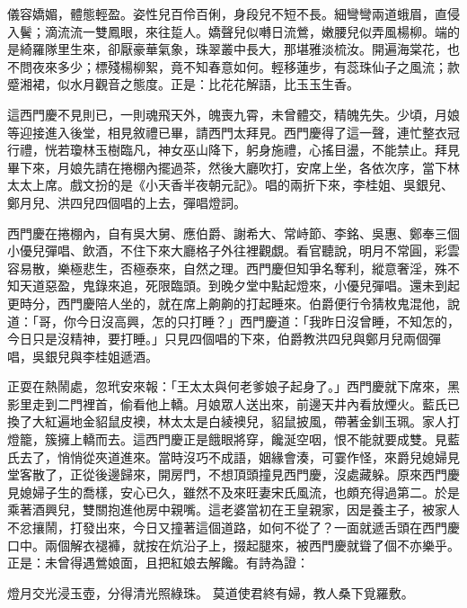 儀容嬌媚，體態輕盈。姿性兒百伶百俐，身段兒不短不長。細彎彎兩道蛾眉，直侵入鬢；滴流流一雙鳳眼，來往踅人。嬌聲兒似囀日流鶯，嫩腰兒似弄風楊柳。端的是綺羅隊里生來，卻厭豪華氣象，珠翠叢中長大，那堪雅淡梳汝。開遍海棠花，也不問夜來多少；標殘楊柳絮，竟不知春意如何。輕移蓮步，有蕊珠仙子之風流；款蹙湘裙，似水月觀音之態度。正是：比花花解語，比玉玉生香。

這西門慶不見則已，一則魂飛天外，魄喪九霄，未曾體交，精魄先失。少頃，月娘等迎接進入後堂，相見敘禮已畢，請西門太拜見。西門慶得了這一聲，連忙整衣冠行禮，恍若瓊林玉樹臨凡，神女巫山降下，躬身施禮，心搖目盪，不能禁止。拜見畢下來，月娘先請在捲棚內擺過茶，然後大廳吹打，安席上坐，各依次序，當下林太太上席。戲文扮的是《小天香半夜朝元記》。唱的兩折下來，李桂姐、吳銀兒、鄭月兒、洪四兒四個唱的上去，彈唱燈詞。

西門慶在捲棚內，自有吳大舅、應伯爵、謝希大、常峙節、李銘、吳惠、鄭奉三個小優兒彈唱、飲酒，不住下來大廳格子外往裡觀覷。看官聽說，明月不常圓，彩雲容易散，樂極悲生，否極泰來，自然之理。西門慶但知爭名奪利，縱意奢淫，殊不知天道惡盈，鬼錄來追，死限臨頭。到晚夕堂中點起燈來，小優兒彈唱。還未到起更時分，西門慶陪人坐的，就在席上齁齁的打起睡來。伯爵便行令猜枚鬼混他，說道：「哥，你今日沒高興，怎的只打睡？」西門慶道：「我昨日沒曾睡，不知怎的，今日只是沒精神，要打睡。」只見四個唱的下來，伯爵教洪四兒與鄭月兒兩個彈唱，吳銀兒與李桂姐遞酒。

正耍在熱鬧處，忽玳安來報：「王太太與何老爹娘子起身了。」西門慶就下席來，黑影里走到二門裡首，偷看他上轎。月娘眾人送出來，前邊天井內看放煙火。藍氏已換了大紅遍地金貂鼠皮襖，林太太是白綾襖兒，貂鼠披風，帶著金釧玉珮。家人打燈籠，簇擁上轎而去。這西門慶正是餓眼將穿，饞涎空咽，恨不能就要成雙。見藍氏去了，悄悄從夾道進來。當時沒巧不成語，姻緣會湊，可霎作怪，來爵兒媳婦見堂客散了，正從後邊歸來，開房門，不想頂頭撞見西門慶，沒處藏躲。原來西門慶見媳婦子生的喬樣，安心已久，雖然不及來旺妻宋氏風流，也頗充得過第二。於是乘著酒興兒，雙關抱進他房中親嘴。這老婆當初在王皇親家，因是養主子，被家人不忿攘鬧，打發出來，今日又撞著這個道路，如何不從了？一面就遞舌頭在西門慶口中。兩個解衣褪褲，就按在炕沿子上，掇起腿來，被西門慶就聳了個不亦樂乎。正是：未曾得遇鶯娘面，且把紅娘去解饞。有詩為證：

燈月交光浸玉壺，分得清光照綠珠。
莫道使君終有婦，教人桑下覓羅敷。


